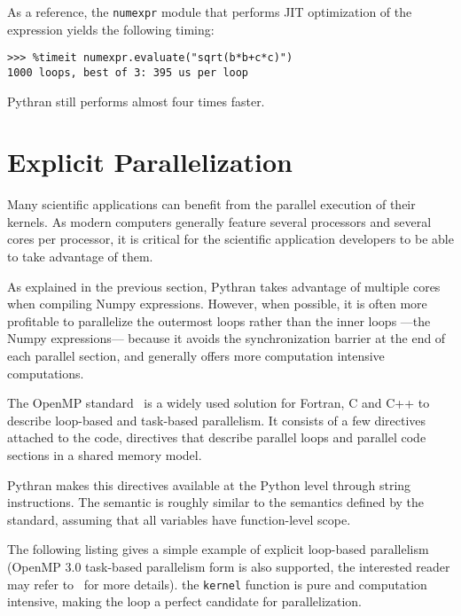 \documentclass[10pt, onecolumn, preprint]{sigplanconf}
\begin{document}
As a reference, the \texttt{numexpr} module that performs JIT optimization of the
expression yields the following timing:

\begin{lstlisting}
>>> %timeit numexpr.evaluate("sqrt(b*b+c*c)")
1000 loops, best of 3: 395 us per loop
\end{lstlisting}

\noindent Pythran still performs almost four times faster.

\section{Explicit Parallelization}
\label{sec:openmp}

Many scientific applications can benefit from the parallel execution of their
kernels. As modern computers generally feature several processors and several
cores per processor, it is critical for the scientific application developers to
be able to take advantage of them.

As explained in the previous section, Pythran takes advantage of multiple cores
when compiling Numpy expressions. However, when possible, it is often more
profitable to parallelize the outermost loops rather than the inner loops
---the Numpy expressions--- because it avoids the synchronization barrier at
the end of each parallel section, and generally offers more computation
intensive computations.

The OpenMP standard~\cite{openmp3.1} is a widely used solution for Fortran, C
and C++ to describe loop-based and task-based parallelism. It consists of a few
directives attached to the code, directives that describe parallel loops and parallel code
sections in a shared memory model.

Pythran makes this directives available at the Python level through string
instructions. The semantic is roughly similar to the semantics defined by the
standard, assuming that all variables have function-level scope.

The following listing gives a simple example of explicit loop-based parallelism
(OpenMP 3.0 task-based parallelism form is also supported, the interested
reader may refer to~\cite{pyhpc2013} for more details). the \texttt{kernel}
function is pure and computation intensive, making the loop a perfect candidate
for parallelization. 
\end{document}
